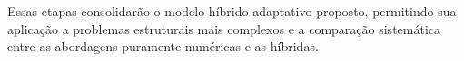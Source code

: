 \documentclass[12pt,openright,oneside,a4paper,english,brazil]{abntex2}
\begin{document}
Essas etapas consolidarão o modelo híbrido adaptativo proposto, permitindo sua aplicação a problemas estruturais mais complexos e a comparação sistemática entre as abordagens puramente numéricas e as híbridas.

\postextual

\printbibliography[heading=bibintoc,title={Referências}]
\end{document}
